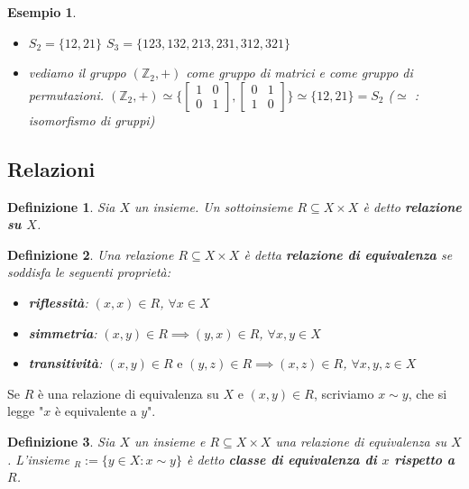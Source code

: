\documentclass[a4paper,12pt]{article}
\theoremstyle{def}
\newtheorem*{definition}{Definizione}
\theoremstyle{prop}
\theoremstyle{esempio}
\newtheorem*{example}{Esempio}
\theoremstyle{dimostrazione}
\theoremstyle{teo}
\theoremstyle{osservazione}
\begin{document}
\begin{example}
	\
	\begin{itemize}
		\item \(S_2 = \{12,21\}\)\newline
		      \(S_3 = \{123,132,213,231,312,321\}\)\newline

		\item vediamo il gruppo \((\mathbb{Z}_2,+)\) come gruppo di matrici e come gruppo di permutazioni. \((\mathbb{Z}_2, +) \simeq \{\begin{bmatrix}
			      1 & 0 \\
			      0 & 1
		      \end{bmatrix}, \begin{bmatrix}
			      0 & 1 \\
			      1 & 0
		      \end{bmatrix}\} \simeq \{12,21\} = S_2\) (\(\simeq\) : isomorfismo di gruppi)
	\end{itemize}
\end{example}

\subsection{Relazioni}

\begin{definition}
	Sia \(X\) un insieme. Un sottoinsieme \(R \subseteq X \times X\) è detto \textbf{relazione su \(X\)}.
\end{definition}

\begin{definition}
	Una relazione \(R \subseteq X \times X\) è detta \textbf{relazione di equivalenza} se soddisfa le seguenti proprietà: \
	\begin{itemize}
		\item \textbf{riflessità}: \((x,x) \in R\), \(\forall x \in X\)
		\item \textbf{simmetria}: \((x,y) \in R \implies (y,x) \in R\), \(\forall x,y \in X\)
		\item \textbf{transitività}: \((x,y) \in R \text{ e } (y,z) \in R \implies (x,z) \in R\), \(\forall x,y,z \in X\)
	\end{itemize}
\end{definition}

Se \(R\) è una relazione di equivalenza su \(X\) e \((x,y) \in R\), scriviamo \(x \sim y\),
che si legge "\(x\) è equivalente a \(y\)".

\begin{definition}
	Sia \(X\) un insieme e \(R \subseteq X \times X\) una relazione di equivalenza su \(X\). L'insieme
	\begin{math}
		[x]_R := \{y \in X : x \sim y\}
	\end{math} è detto \textbf{classe di equivalenza di \(x\) rispetto a \(R\)}.
\end{definition}
\end{document}
